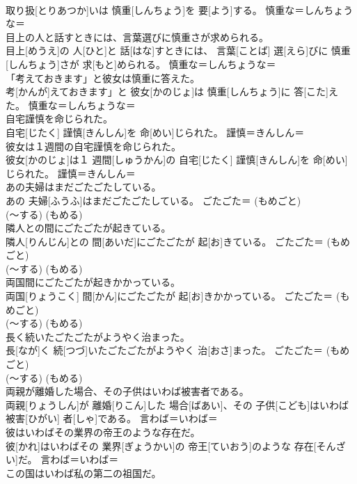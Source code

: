 \documentclass[8pt]{extreport}
\begin{document}
\begin{CJK}{UTF8}{min}
{\\	取り扱[とりあつか]いは 慎重[しんちょう]を 要[よう]する。	慎重な＝しんちょうな＝ 
\\	目上の人と話すときには、言葉選びに慎重さが求められる。	
\\	目上[めうえ]の 人[ひと]と 話[はな]すときには、 言葉[ことば] 選[えら]びに 慎重[しんちょう]さが 求[もと]められる。	慎重な＝しんちょうな＝ 
\\	「考えておきます」と彼女は慎重に答えた。	
\\	考[かんが]えておきます」と 彼女[かのじょ]は 慎重[しんちょう]に 答[こた]えた。	慎重な＝しんちょうな＝ 
\\	自宅謹慎を命じられた。	
\\	自宅[じたく] 謹慎[きんしん]を 命[めい]じられた。	謹慎＝きんしん＝ 
\\	彼女は１週間の自宅謹慎を命じられた。	
\\	彼女[かのじょ]は１ 週間[しゅうかん]の 自宅[じたく] 謹慎[きんしん]を 命[めい]じられた。	謹慎＝きんしん＝ 
\\	あの夫婦はまだごたごたしている。	
\\	あの 夫婦[ふうふ]はまだごたごたしている。	ごたごた＝ (もめごと) 
\\	(〜する) (もめる) 
\\	隣人との間にごたごたが起きている。	
\\	隣人[りんじん]との 間[あいだ]にごたごたが 起[お]きている。	ごたごた＝ (もめごと) 
\\	(〜する) (もめる) 
\\	両国間にごたごたが起きかかっている。	
\\	両国[りょうこく] 間[かん]にごたごたが 起[お]きかかっている。	ごたごた＝ (もめごと) 
\\	(〜する) (もめる) 
\\	長く続いたごたごたがようやく治まった。	
\\	長[なが]く 続[つづ]いたごたごたがようやく 治[おさ]まった。	ごたごた＝ (もめごと) 
\\	(〜する) (もめる) 
\\	両親が離婚した場合、その子供はいわば被害者である。	
\\	両親[りょうしん]が 離婚[りこん]した 場合[ばあい]、その 子供[こども]はいわば 被害[ひがい] 者[しゃ]である。	言わば＝いわば＝ 
\\	彼はいわばその業界の帝王のような存在だ。	
\\	彼[かれ]はいわばその 業界[ぎょうかい]の 帝王[ていおう]のような 存在[そんざい]だ。	言わば＝いわば＝ 
\\	この国はいわば私の第二の祖国だ。	
}
\end{CJK}
\end{document}

